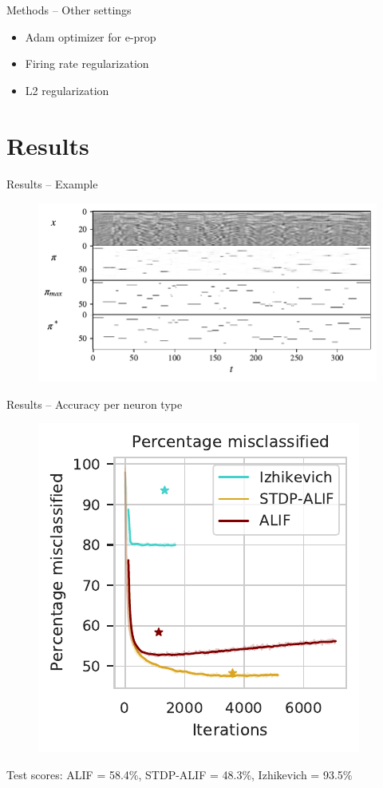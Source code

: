 \documentclass[t]{beamer}
\begin{document}
\begin{frame}{Methods -- Other settings}
  \begin{itemize}[label=--]
    \item Adam optimizer for e-prop
    \item Firing rate regularization
    \item L2 regularization
  \end{itemize}
\end{frame}

\section{Results}

\begin{frame}{Results -- Example}
  \begin{figure}[!ht]
    \centering
    \includegraphics[width=\linewidth]{InOutPair}
  \end{figure}
\end{frame}

\begin{frame}{Results -- Accuracy per neuron type}
  \begin{figure}[!ht]
    \centering
    \includegraphics[width=0.5\linewidth]{percwrong}
  \end{figure}
  Test scores: ALIF = 58.4\%, STDP-ALIF = 48.3\%, Izhikevich = 93.5\%
\end{frame}
\end{document}
